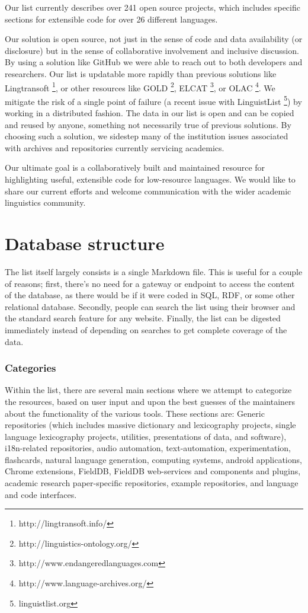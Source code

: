 \documentclass[10pt, a4paper]{article}
\begin{document}
Our list currently describes over 241 open source projects, which includes specific sections for extensible code for over 26 different languages.

Our solution is open source, not just in the sense of code and data availability (or disclosure) but
in the sense of collaborative involvement and inclusive discussion. By using a solution like
GitHub we were able to reach out to both developers and researchers. Our list is updatable more rapidly than previous solutions like Lingtransoft \footnote{http://lingtransoft.info/}, or other resources like GOLD \footnote{http://linguistics-ontology.org/}, ELCAT \footnote{http://www.endangeredlanguages.com}, or OLAC \footnote{http://www.language-archives.org/}. We mitigate the risk of a single point of failure (a recent issue with LinguistList \footnote{linguistlist.org}) by working in a distributed fashion. The data in our list is open and can be copied and reused by anyone, something not necessarily true of previous solutions. By choosing such a solution, we sidestep many of the institution issues associated with archives and repositories currently servicing academics.

Our ultimate goal is a collaboratively built and maintained resource for highlighting
useful, extensible code for low-resource languages. We would like to share our current efforts
and welcome communication with the wider academic linguistics community.

\section{Database structure}

The list itself largely consists is a single Markdown file. This is useful for a couple of reasons; first, there's no need for a gateway or endpoint to access the content of the database, as there would be if it were coded in SQL, RDF, or some other relational database. Secondly, people can search the list using their browser and the standard search feature for any website. Finally, the list can be digested immediately instead of depending on searches to get complete coverage of the data. 

\subsubsection{Categories}

Within the list, there are several main sections where we attempt to categorize the resources, based on user input and upon the best guesses of the maintainers about the functionality of the various tools. These sections are: Generic repositories (which includes massive dictionary and lexicography projects, single language lexicography projects, utilities, presentations of data, and software), i18n-related repositories, audio automation, text-automation, experimentation, flashcards, natural language generation, computing systems, android applications, Chrome extensions, FieldDB, FieldDB web-services and components and plugins, academic research paper-specific repositories, example repositories, and language  and code interfaces. 
\end{document}
